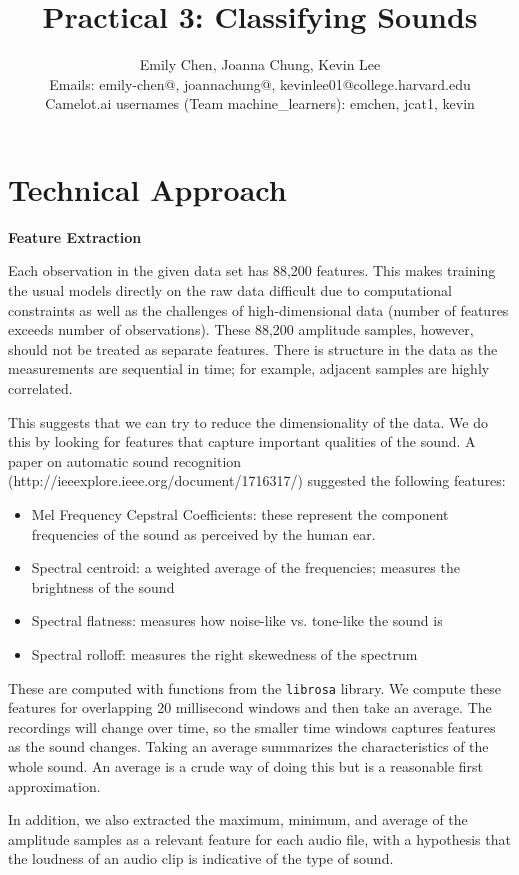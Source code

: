 \documentclass[11pt]{article}
\title{Practical 3: Classifying Sounds}
\author{Emily Chen, Joanna Chung, Kevin Lee \\
Emails: emily-chen@, joannachung@, kevinlee01@college.harvard.edu \\
Camelot.ai usernames (Team machine\_learners): emchen, jcat1, kevin}
\begin{document}
\maketitle{}

\section{Technical Approach}

\begin{center}
  \textbf{Feature Extraction}
\end{center}

Each observation in the given data set has 88,200 features. This makes training the usual models directly on the raw data difficult due to computational constraints as well as the challenges of high-dimensional data (number of features exceeds number of observations). These 88,200 amplitude samples, however, should not be treated as separate features. There is structure in the data as the measurements are sequential in time; for example, adjacent samples are highly correlated. 
 
This suggests that we can try to reduce the dimensionality of the data. We do this by looking for features that capture important qualities of the sound. A paper on automatic sound recognition (http://ieeexplore.ieee.org/document/1716317/) suggested the following features:
\begin{itemize}
    \item Mel Frequency Cepstral Coefficients: these represent the component frequencies of the sound as perceived by the human ear. 
    \item Spectral centroid: a weighted average of the frequencies; measures the brightness of the sound
    \item Spectral flatness: measures how noise-like vs. tone-like the sound is
    \item Spectral rolloff: measures the right skewedness of the spectrum 
\end{itemize}

These are computed with functions from the \verb#librosa# library. We compute these features for overlapping 20 millisecond windows and then take an average. The recordings will change over time, so the smaller time windows captures features as the sound changes. Taking an average summarizes the characteristics of the whole sound. An average is a crude way of doing this but is a reasonable first approximation.

In addition, we also extracted the maximum, minimum, and average of the amplitude samples as a relevant feature for each audio file, with a hypothesis that the loudness of an audio clip is indicative of the type of sound.
\end{document}
